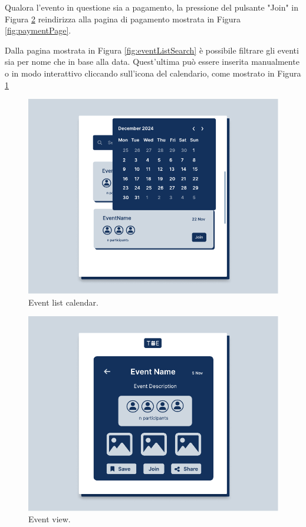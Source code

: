 \documentclass[9pt]{extarticle}
\begin{document}
Qualora l'evento in questione sia a pagamento, la pressione del pulsante "Join" in Figura \ref{fig:eventView} reindirizza alla pagina di pagamento mostrata in Figura \ref{fig:paymentPage}.


Dalla pagina mostrata in Figura \ref{fig:eventListSearch} è possibile filtrare gli eventi sia per nome che in base alla data. Quest'ultima può essere inserita manualmente o in modo interattivo cliccando sull'icona del calendario, come mostrato in Figura \ref{fig:eventListSearchCalendar}

\begin{figure}[!htb]
	\centering
	\includegraphics[width=.7\linewidth]{./images/eventListSearchCalendar.pdf}
	\caption{Event list calendar.}
	\label{fig:eventListSearchCalendar}
\end{figure}
\newpage

\begin{figure}[!htb]
	\centering
	\includegraphics[width=.7\linewidth]{./images/EventView.pdf}
	\caption{Event view.}
	\label{fig:eventView}
\end{figure}
\end{document}
